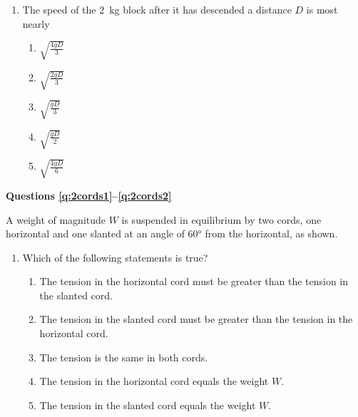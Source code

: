\documentclass{../../../oss-classkick}
\begin{document}
\begin{multicols*}{2}
\begin{enumerate}[resume,leftmargin=18pt]
  \item The speed of the \SI{2}{\kilo\gram} block after it has descended a
    distance $D$ is most nearly
    \begin{enumerate}[nosep,leftmargin=18pt,label=(\Alph*)]
    \item $\displaystyle\sqrt{\frac{4gD}{3}}$
    \item $\displaystyle\sqrt{\frac{2gD}{3}}$
    \item $\displaystyle\sqrt{\frac{gD}{3}}$
    \item $\displaystyle\sqrt{\frac{gD}{2}}$
    \item $\displaystyle\sqrt{\frac{4gD}{6}}$
    \end{enumerate}
    \label{q:pulley2}
  \end{enumerate}
  
  \textbf{Questions \ref{q:2cords1}--\ref{q:2cords2}}

  A weight of magnitude $W$ is suspended in equilibrium by two cords, one
  horizontal and one slanted at an angle of \ang{60} from the horizontal, as
  shown.
  \begin{center}
  \end{center}
  \begin{enumerate}[resume,leftmargin=18pt]
  \item Which of the following statements is true?
    \begin{enumerate}[nosep,leftmargin=18pt,label=(\Alph*)]
    \item The tension in the horizontal cord must be greater than the tension
      in the slanted cord.
    \item The tension in the slanted cord must be greater than the tension in
      the horizontal cord.
    \item The tension is the same in both cords.
    \item The tension in the horizontal cord equals the weight $W$.
    \item The tension in the slanted cord equals the weight $W$.
    \end{enumerate}
    \label{q:2cords1}
    \vspace{.7in}
    

\end{enumerate}
\end{multicols*}
\end{document}
